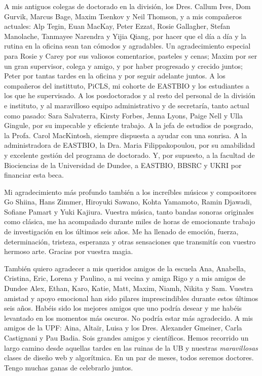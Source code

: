 A mis antiguos colegas de doctorado en la división, los Dres. Callum Ives, Dom Gurvik, Marcus Bage, Maxim Tsenkov y Neil Thomson, y a mis compañeros actuales: Alp Tegin, Euan MacKay, Peter Ezzat, Rosie Gallagher, Stefan Manolache, Tanmayee Narendra y Yijia Qiang, por hacer que el día a día y la rutina en la oficina sean tan cómodos y agradables. Un agradecimiento especial para Rosie y Carey por sus valiosos comentarios, pasteles y cenas; Maxim por ser un gran supervisor, colega y amigo, y por haber progresado y crecido juntos; Peter por tantas tardes en la oficina y por seguir adelante juntos. A los compañeros del instittuto, PiCLS, mi cohorte de EASTBIO y los estudiantes a los que he supervisado. A los posdoctorados y al resto del personal de la división e instituto, y al maravilloso equipo administrativo y de secretaría, tanto actual como pasado: Sara Salvaterra, Kirsty Forbes, Jenna Lyons, Paige Nell y Ulla Gingule, por su impecable y eficiente trabajo. A la jefa de estudios de posgrado, la Profa. Carol MacKintosh, siempre dispuesta a ayudar con una sonrisa. A la administradora de EASTBIO, la Dra. Maria Filippakopoulou, por su amabilidad y excelente gestión del programa de doctorado. Y, por supuesto, a la facultad de Biociencias de la Universidad de Dundee, a EASTBIO, BBSRC y UKRI por financiar esta beca.

Mi agradecimiento más profundo también a los increíbles músicos y compositores Go Shiina, Hans Zimmer, Hiroyuki Sawano, Kohta Yamamoto, Ramin Djawadi, Sofiane Pamart y Yuki Kajiura. Vuestra música, tanto bandas sonoras originales como clásica, me ha acompañado durante miles de horas de emocionante trabajo de investigación en los últimos seis años. Me ha llenado de emoción, fuerza, determinación, tristeza, esperanza y otras sensaciones que transmitís con vuestro hermoso arte. Gracias por vuestra magia.

\newpage

También quiero agradecer a mis queridos amigos de la escuela Ana, Anabella, Cristina, Eric, Lorena y Paulino, a mi vecina y amiga Rigo y a mis amigos de Dundee Alex, Ethan, Karo, Katie, Matt, Maxim, Niamh, Nikita y Sam. Vuestra amistad y apoyo emocional han sido pilares imprescindibles durante estos últimos seis años. Habéis sido los mejores amigos que uno podría desear y me habéis levantado en los momentos más oscuros. No podría estar más agradecido. A mis amigos de la UPF: Aina, Altaïr, Luisa y los Dres. Alexander Gmeiner, Carla Castignani y Pau Badia. Sois grandes amigos y científicos. Hemos recorrido un largo camino desde aquellas tardes en las ruinas de la UB y nuestras \textit{maravillosas} clases de diseño web y algorítmica. En un par de meses, todos seremos doctores. Tengo muchas ganas de celebrarlo juntos.

